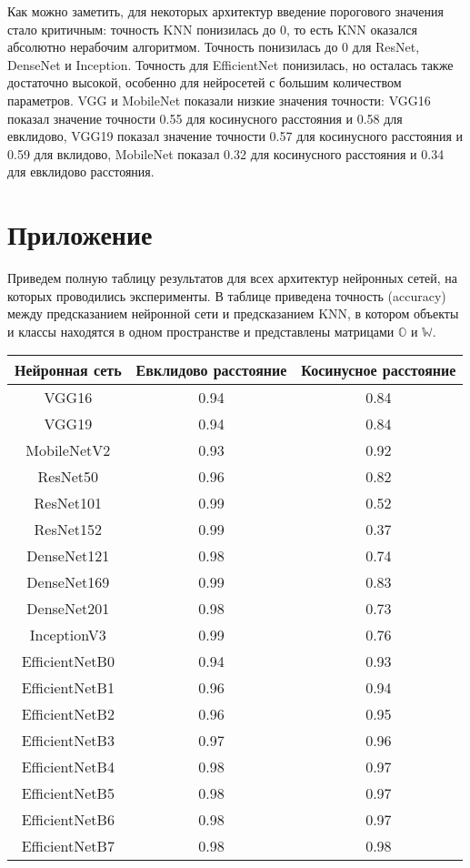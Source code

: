 \documentclass{article}
\begin{document}
Как можно заметить, для некоторых архитектур введение порогового значения стало критичным: точность KNN понизилась до 0, то есть KNN оказался абсолютно нерабочим алгоритмом. Точность понизилась до 0 для ResNet, DenseNet и Inception. Точность для EfficientNet понизилась, но осталась также достаточно высокой, особенно для нейросетей с большим количеством параметров. VGG и MobileNet показали низкие значения точности: VGG16 показал значение точности 0.55 для косинусного расстояния и 0.58 для евклидово, VGG19 показал значение точности 0.57 для косинусного расстояния и 0.59 для вклидово, MobileNet показал 0.32 для косинусного расстояния и 0.34 для евклидово расстояния. 



\newpage

\section{Приложение}

Приведем полную таблицу результатов для всех архитектур нейронных сетей, на которых проводились эксперименты. В таблице приведена точность (accuracy) между предсказанием нейронной сети и предсказанием KNN, в котором объекты и классы находятся в одном пространстве и представлены матрицами $\mathbb{O}$ и $\mathbb{W}$.

\begin{center}
\begin{tabular}{ |c|c|c| } 
 \hline
 Нейронная сеть & Евклидово расстояние & Косинусное расстояние \\ 
 \hline
 \hline
 VGG16 & 0.94 & 0.84 \\
 \hline
 VGG19 & 0.94 & 0.84 \\
 \hline
 MobileNetV2 & 0.93 & 0.92 \\
 \hline
 ResNet50 & 0.96 & 0.82 \\
 \hline
 ResNet101 & 0.99 & 0.52 \\
 \hline
 ResNet152 & 0.99 & 0.37 \\
 \hline
 DenseNet121 & 0.98 & 0.74 \\
 \hline
 DenseNet169 & 0.99 & 0.83 \\
 \hline
 DenseNet201 & 0.98 & 0.73 \\
 \hline
 InceptionV3 & 0.99 & 0.76 \\
 \hline
 EfficientNetB0 & 0.94 & 0.93 \\
 \hline
 EfficientNetB1 & 0.96 & 0.94 \\
 \hline
 EfficientNetB2 & 0.96 & 0.95 \\
 \hline
 EfficientNetB3 & 0.97 & 0.96 \\
 \hline
 EfficientNetB4 & 0.98 & 0.97 \\
 \hline
 EfficientNetB5 & 0.98 & 0.97 \\
 \hline
 EfficientNetB6 & 0.98 & 0.97 \\
 \hline
 EfficientNetB7 & 0.98 & 0.98 \\
 \hline
\end{tabular}
\end{center}
\end{document}
